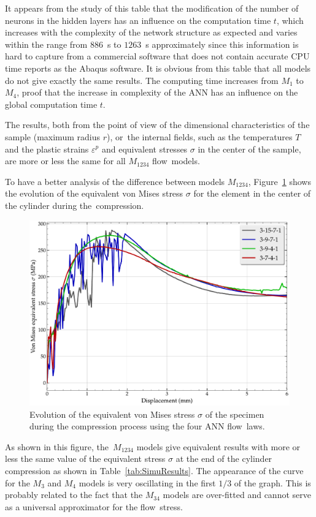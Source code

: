 \documentclass[algorithms,article,accept,pdftex,moreauthors]{Definitions/mdpi}
\begin{document}
\vspace{-6pt}

It appears from the study of this table that the modification of the number of neurons in the hidden layers has an influence on the computation time $t$, which increases with the complexity of the network structure as expected and varies within the range from $886$~s to $1263$~s approximately since this information is hard to capture from a commercial software that does not contain accurate CPU time reports as the Abaqus software.
It is obvious from this table that all models do not give exactly the same results.
The computing time increases from $M_{1}$ to $M_4$, proof that the increase in complexity of the ANN has an influence on the global computation time $t$.

The results, both from the point of view of the dimensional characteristics of the sample (maximum radius $r$), or~the internal fields, such as the temperatures $T$ and the plastic strains $\varepsilon^p$ and equivalent stresses $\sigma$ in the center of the sample, are more or less the same for all $M_{1234}$ flow~models.

To have a better analysis of the difference between models $M_{1234}$, Figure~\ref{fig:misesCurve} shows the evolution of the equivalent von Mises stress $\sigma$ for the element in the center of the cylinder during the~compression.
\begin{figure}[H]
\includegraphics[width=0.72\columnwidth]{Figures/vonMisesCurve}
\caption{Evolution of the equivalent von Mises stress $\sigma$ of the specimen during the compression process using the four ANN flow~laws.}
\label{fig:misesCurve}
\end{figure}
As shown in this figure, the~$M_{1234}$ models give equivalent results with more or less the same value of the equivalent stress $\sigma$ at the end of the cylinder compression as shown in Table~\ref{tab:SimuResults}.
The appearance of the curve for the $M_3$ and $M_4$ models is very oscillating in the first $1/3$ of the graph.
This is probably related to the fact that the $M_{34}$ models are over-fitted and cannot serve as a universal approximator for the flow~stress.
\end{document}
